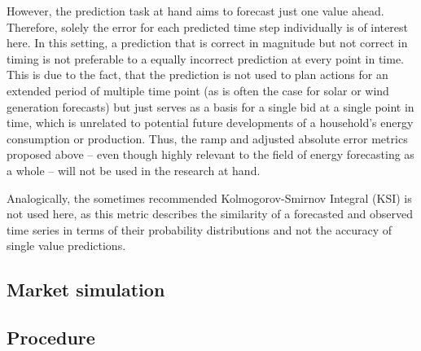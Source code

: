 However, the prediction task at hand aims to forecast just one value ahead. Therefore, solely the error for each predicted time step individually is of interest here. In this setting, a prediction that is correct in magnitude but not correct in timing is not preferable to a equally incorrect prediction at every point in time. This is due to the fact, that the prediction is not used to plan actions for an extended period of multiple time point (as is often the case for solar or wind generation forecasts) but just serves as a basis for a single bid at a single point in time, which is unrelated to potential future developments of a household's energy consumption or production. Thus, the ramp and adjusted absolute error metrics proposed above -- even though highly relevant to the field of energy forecasting as a whole -- will not be used in the research at hand.

Analogically, the sometimes recommended Kolmogorov-Smirnov Integral (KSI) \citep{Espinar:2009} is not used here, as this metric describes the similarity of a forecasted and observed time series in terms of their probability distributions and not the accuracy of single value predictions.




\subsection{Market simulation} \label{Sec:Method;Subsec:Market}









\subsection{Procedure} \label{Sec:Method;Subsec:Procedure}


